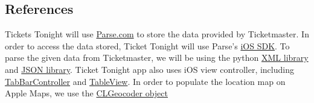 	\subsection{References}
	\label{reference}
	  Tickets Tonight will use \href{https://parse.com/}{Parse.com} to store the data provided by 
	  Ticketmaster. In order to access the data stored, Ticket Tonight will use Parse\rq s 
	  \href{https://parse.com/docs/ios_guide#top/iOS}{iOS SDK}. To parse the given data from 
	  Ticketmaster, we will be using the python 
	  \href{https://docs.python.org/2/library/xml.etree.elementtree.html}{XML library} and 
	  \href{https://docs.python.org/2/library/json.html}{JSON library}. Ticket Tonight app also uses iOS
	  view controller, including 
	  \href{https://developer.apple.com/library/ios/documentation/WindowsViews/Conceptual/ViewControl
	  	lerCatalog/Chapters/TabBarControllers.html}{TabBarController} and
	  \href{https://developer.apple.com/library/ios/documentation/UserExperience/Conceptual/TableView_
	  	iPhone/CreateConfigureTableView/CreateConfigureTableView.htm}{TableView}. In order to populate the 
	  location map on Apple Maps, we use the \href{https://developer.apple.com/library/mac/documentation/CoreLocation/Reference/CLGeocoder_
	  	class/index.html}{CLGeocoder object} 
	  